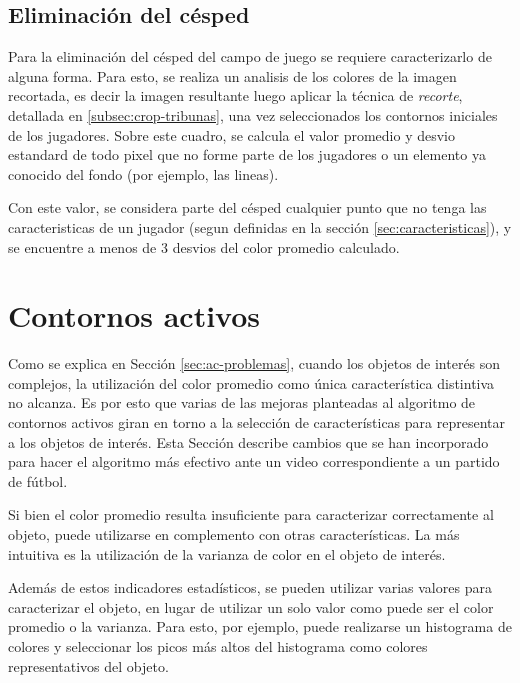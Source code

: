 \subsection{Eliminación del césped}

Para la eliminación del césped del campo de juego se requiere caracterizarlo
de alguna forma. Para esto, se realiza un analisis de los colores de
la imagen recortada, es decir la imagen resultante luego aplicar la técnica
de \textit{recorte}, detallada en \ref{subsec:crop-tribunas}, una vez seleccionados
los contornos iniciales de los jugadores. Sobre este cuadro, se calcula el valor
promedio y desvio estandard de todo pixel que no forme parte de los jugadores o
un elemento ya conocido del fondo (por ejemplo, las lineas). 

Con este valor, se considera parte del césped cualquier punto que no tenga las
caracteristicas de un jugador (segun definidas en la sección \ref{sec:caracteristicas}),
y se encuentre a menos de 3 desvios del color promedio calculado.

\section{Contornos activos}
\label{sec:ac-extension}

Como se explica en Sección \ref{sec:ac-problemas}, cuando los objetos de
interés son complejos, la utilización del color promedio como única
característica distintiva no alcanza. Es por esto que varias de las mejoras
planteadas al algoritmo de contornos activos giran en torno a la selección de
características para representar a los objetos de interés. Esta Sección
describe cambios que se han incorporado para hacer el algoritmo más efectivo
ante un video correspondiente a un partido de fútbol.

Si bien el color promedio resulta insuficiente para caracterizar correctamente
al objeto, puede utilizarse en complemento con otras características. La más
intuitiva es la utilización de la varianza de color en el objeto de interés.

Además de estos indicadores estadísticos, se pueden utilizar varias valores
para caracterizar el objeto, en lugar de utilizar un solo valor como puede ser
el color promedio o la varianza. Para esto, por ejemplo, puede realizarse un
histograma de colores y seleccionar los picos más altos del histograma como
colores representativos del objeto.

